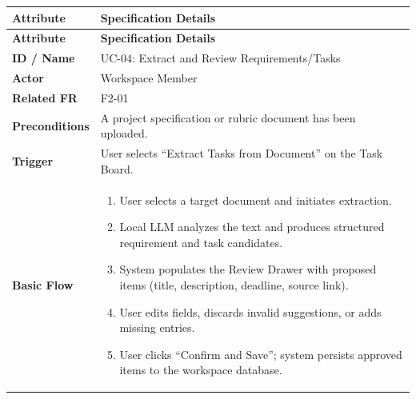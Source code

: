 \begin{longtable}{>{\raggedright\arraybackslash}p{}>{\raggedright\arraybackslash}p{}}

\hline

\rowcolor{tablehead}

\textbf{Attribute} & \textbf{Specification Details} \\ \hline

\endfirsthead

\hline

\rowcolor{tablehead}

\textbf{Attribute} & \textbf{Specification Details} \\ \hline

\endhead

\endfoot

\endlastfoot

\textbf{ID / Name} & UC-04: Extract and Review Requirements/Tasks \\ \hline

\textbf{Actor} & Workspace Member \\ \hline

\textbf{Related FR} & F2-01 \\ \hline

\textbf{Preconditions} & A project specification or rubric document has been uploaded. \\ \hline

\textbf{Trigger} & User selects ``Extract Tasks from Document'' on the Task Board. \\ \hline

\textbf{Basic Flow} & \begin{enumerate}[nosep,leftmargin=*,label=\arabic*.]

    \item User selects a target document and initiates extraction.

    \item Local LLM analyzes the text and produces structured requirement and task candidates.

    \item System populates the Review Drawer with proposed items (title, description, deadline, source link).

    \item User edits fields, discards invalid suggestions, or adds missing entries.

    \item User clicks ``Confirm and Save''; system persists approved items to the workspace database.


\end{enumerate}
\end{longtable}
